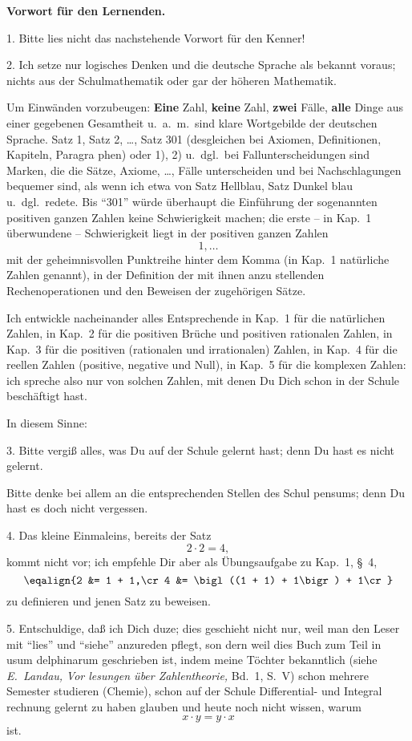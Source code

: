 
\line{}\baselineskip
\centerline{\bf Vorwort f\"ur den Lernenden.}
\bigskip

1. Bitte lies nicht das nachstehende Vorwort f\"ur den Kenner!

2. Ich setze nur logisches Denken und die deutsche Sprache
als bekannt voraus; nichts aus der Schulmathematik oder gar der
h\"oheren Mathematik.

Um Einw\"anden vorzubeugen: {\bf Eine} Zahl, {\bf keine} Zahl, {\bf zwei}
F\"alle, {\bf alle} Dinge aus einer gegebenen Gesamtheit u.~a.~m.\ sind
klare Wortgebilde der deutschen Sprache.  Satz 1, Satz 2, \dots,
Satz 301 (desgleichen bei Axiomen, Definitionen, Kapiteln, Paragra%
phen) oder 1), 2) u.~dgl.\ bei Fallunterscheidungen sind Marken, die
die S\"atze, Axiome, \dots, F\"alle unterscheiden und bei Nachschlagungen
bequemer sind, als wenn ich etwa von Satz Hellblau, Satz Dunkel%
blau u.~dgl.\ redete.  Bis ``301'' w\"urde \"uberhaupt die Einf\"uhrung
der sogenannten positiven ganzen Zahlen keine Schwierigkeit machen;
die erste -- in Kap.~1 \"uberwundene -- Schwierigkeit liegt in der
positiven ganzen Zahlen
$$1, \ldots$$
mit der geheimnisvollen Punktreihe hinter dem Komma (in Kap.~1
nat\"urliche Zahlen genannt), in der Definition der mit ihnen anzu%
stellenden Rechenoperationen und den Beweisen der zugeh\"origen
S\"atze.

Ich entwickle nacheinander alles Entsprechende in Kap.~1 f\"ur
die nat\"urlichen Zahlen, in Kap.~2 f\"ur die positiven Br\"uche und
positiven rationalen Zahlen, in Kap.~3 f\"ur die positiven (rationalen
und irrationalen) Zahlen, in Kap.~4 f\"ur die reellen Zahlen (positive,
negative und Null), in Kap.~5 f\"ur die komplexen Zahlen: ich spreche
also nur von solchen Zahlen, mit denen Du Dich schon in der Schule
besch\"aftigt hast.

In diesem Sinne:

3. Bitte vergi{\ss} alles, was Du auf der Schule gelernt hast;
denn Du hast es nicht gelernt.

Bitte denke bei allem an die entsprechenden Stellen des Schul%
pensums; denn Du hast es doch nicht vergessen.

4. Das kleine Einmaleins, bereits der Satz
$$2 \cdot 2 = 4,$$
kommt nicht vor; ich empfehle Dir aber als \"Ubungsaufgabe zu
Kap.~1, {\S}~4,
$$\eqalign{2 &= 1 + 1,\cr
4 &= \bigl((1 + 1) + 1\bigr) + 1\cr}$$
zu definieren und jenen Satz zu beweisen.

5. Entschuldige, da{\ss} ich Dich duze; dies geschieht nicht nur,
weil man den Leser mit ``lies'' und ``siehe'' anzureden pflegt, son%
dern weil dies Buch zum Teil in usum delphinarum geschrieben
ist, indem meine T\"ochter bekanntlich (siehe {\sl E.~Landau,} {\it Vor%
lesungen \"uber Zahlentheorie,} Bd.~1, S.~V) schon mehrere Semester
studieren (Chemie), schon auf der Schule Differential- und Integral%
rechnung gelernt zu haben glauben und heute noch nicht wissen,
warum
$$x \cdot y = y \cdot x$$
ist.
\bigskip

